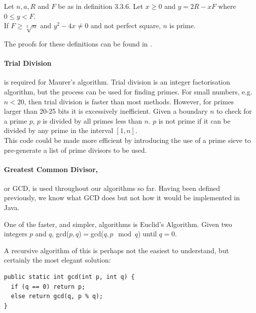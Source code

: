     \begin{mathdef}
      Let $n,a,R$ and $F$ be as in definition 3.3.6. Let $x \geq 0$ and $y = 2R - xF$ where $0 \leq y < F$. \\
      If $F \geq \sqrt[3]{n}$ and $y^2-4x \neq 0$ and not perfect square, $n$ is prime.
    \end{mathdef}
    
    The proofs for these definitions can be found in \cite{Maurer:1991aa}.
    
      \paragraph{Trial Division} 
      
      is required for Maurer's algorithm. Trial division is an integer factorisation algorithm, but the process can be used for finding primes. For small numbers, e.g. $n < 20$, then trial division is faster than most methods. However, for primes larger than 20-25 bits it is excessively inefficient\cite{Shwarz:2007aa}. Given a boundary $n$ to check for a prime $p$, $p$ is divided by all primes less than $n$. $p$ is not prime if it can be divided by any prime in the interval $[1,n]$. \\
      
      
      
      This code could be made more efficient by introducing the use of a prime sieve to pre-generate a list of prime divisors to be used.
      
      \paragraph{Greatest Common Divisor,} or GCD, is used throughout our algorithms so far. Having been defined previously, we know what GCD does but not how it would be implemented in Java.
      
      One of the faster, and simpler, algorithms is Euclid's Algorithm. Given two integers $p$ and $q$, gcd($p,q$)$=$gcd($q, p \mod q$) until $q=0$.
      
      A recursive algorithm of this is perhaps not the easiest to understand, but certainly the most elegant solution: \\
      
      \begin{lstlisting}
public static int gcd(int p, int q) {
  if (q == 0) return p;
  else return gcd(q, p % q);
}
\end{lstlisting}
      
